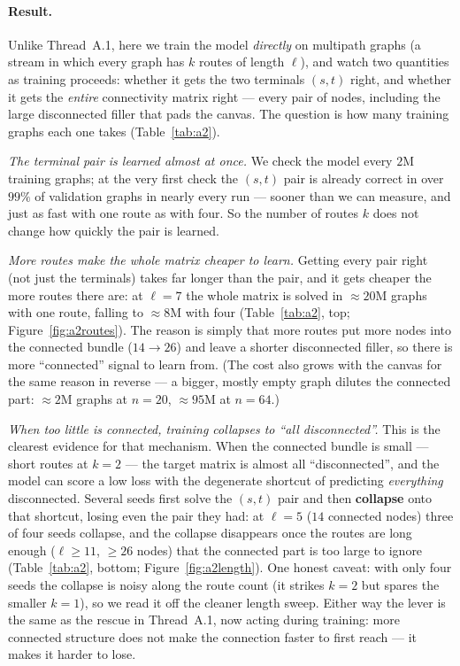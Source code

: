 \documentclass[11pt,a4paper]{article}
\begin{document}
\paragraph{Result.} Unlike Thread~A.1, here we train the model \emph{directly} on multipath graphs
(a stream in which every graph has $k$ routes of length $\ell$), and watch two quantities as training
proceeds: whether it gets the two terminals $(s,t)$ right, and whether it gets the \emph{entire}
connectivity matrix right --- every pair of nodes, including the large disconnected filler that pads
the canvas. The question is how many training graphs each one takes (Table~\ref{tab:a2}).

\emph{The terminal pair is learned almost at once.} We check the model every $2$M training graphs; at
the very first check the $(s,t)$ pair is already correct in over $99\%$ of validation graphs in
nearly every run --- sooner than we can measure, and just as fast with one route as with four. So the
number of routes $k$ does not change how quickly the pair is learned.

\emph{More routes make the whole matrix cheaper to learn.} Getting every pair right (not just the
terminals) takes far longer than the pair, and it gets cheaper the more routes there are: at $\ell=7$
the whole matrix is solved in $\approx20$M graphs with one route, falling to $\approx8$M with four
(Table~\ref{tab:a2}, top; Figure~\ref{fig:a2routes}). The reason is simply that more routes put more
nodes into the connected bundle ($14\to26$) and leave a shorter disconnected filler, so there is more
``connected'' signal to learn from. (The cost also grows with the canvas for the same reason in
reverse --- a bigger, mostly empty graph dilutes the connected part: $\approx2$M graphs at $n=20$,
$\approx95$M at $n=64$.)

\emph{When too little is connected, training collapses to ``all disconnected''.} This is the clearest
evidence for that mechanism. When the connected bundle is small --- short routes at $k=2$ --- the
target matrix is almost all ``disconnected'', and the model can score a low loss with the degenerate
shortcut of predicting \emph{everything} disconnected. Several seeds first solve the $(s,t)$ pair and
then \textbf{collapse} onto that shortcut, losing even the pair they had: at $\ell=5$ ($14$ connected
nodes) three of four seeds collapse, and the collapse disappears once the routes are long enough
($\ell\ge11$, $\ge26$ nodes) that the connected part is too large to ignore (Table~\ref{tab:a2},
bottom; Figure~\ref{fig:a2length}). One honest caveat: with only four seeds the collapse is noisy
along the route count (it strikes $k=2$ but spares the smaller $k=1$), so we read it off the cleaner
length sweep. Either way the lever is the same as the rescue in Thread~A.1, now acting during
training: more connected structure does not make the connection faster to first reach --- it makes it
harder to lose.
\end{document}
